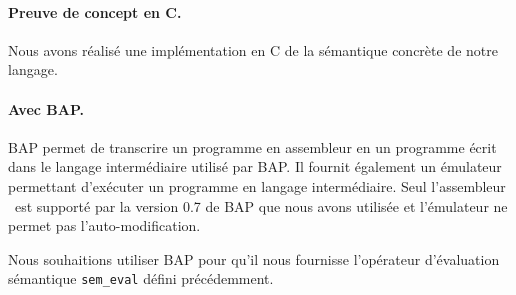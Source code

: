 \paragraph{Preuve de concept en C.}
Nous avons réalisé une implémentation en C de la sémantique concrète de notre langage.


\paragraph{Avec BAP.}
BAP permet de transcrire un programme en assembleur en un programme écrit dans le langage intermédiaire utilisé par BAP.
Il fournit également un émulateur permettant d'exécuter un programme en langage intermédiaire.
Seul l'assembleur \xq\ est supporté par la version 0.7 de BAP que nous avons utilisée et l'émulateur ne permet pas l'auto-modification.

Nous souhaitions utiliser BAP pour qu'il nous fournisse l'opérateur d'évaluation sémantique \texttt{sem\_eval} défini précédemment.
